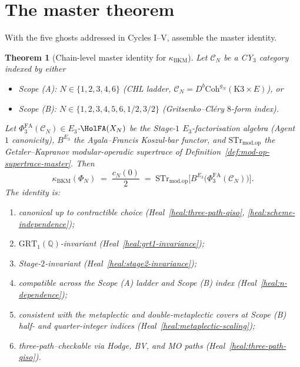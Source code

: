 \documentclass[11pt]{amsart}
\newtheorem{theorem}{Theorem}[section]
\providecommand{\Q}{\mathbb{Q}}
\providecommand{\cC}{\mathcal{C}}
\providecommand{\GRT}{\mathrm{GRT}}
\providecommand{\PhiFA}{\Phi^{\mathrm{FA}}}
\providecommand{\Coh}{\mathrm{Coh}}
\providecommand{\STr}{\mathrm{STr}}
\providecommand{\modop}{\mathrm{mod.op}}
\providecommand{\kBKM}{\kappa_{\mathrm{BKM}}}
\begin{document}
\section{The master theorem}
\label{sec:master-theorem}

With the five ghosts addressed in Cycles I--V, assemble the master
identity.

\begin{theorem}[Chain-level master identity for $\kBKM$]
\label{thm:bl-master-kappa-bkm-chain-level-wave}
Let $\cC_N$ be a CY$_3$ category indexed by either
\begin{itemize}
\item Scope (A): $N \in \{1, 2, 3, 4, 6\}$ (CHL ladder,
$\cC_N = D^b\Coh^{g_N}(\mathrm{K3} \times E)$), or
\item Scope (B): $N \in \{1, 2, 3, 4, 5, 6, 1/2, 3/2\}$
(Gritsenko--Cl\'ery $8$-form index).
\end{itemize}
Let $\PhiFA_3(\cC_N) \in E_3$-$\HolFA(X_N)$ be the Stage-$1$
$E_3$-factorisation algebra (Agent $1$ canonicity), $B^{E_3}$ the
Ayala--Francis Koszul-bar functor, and $\STr_{\modop}$ the
Getzler--Kapranov modular-operadic supertrace of
Definition~\ref{def:mod-op-supertrace-master}. Then
\begin{equation}
\label{eq:master-theorem-final}
 \kBKM(\Phi_N) \;=\; \frac{c_N(0)}{2}
 \;=\; \STr_{\modop}\bigl[B^{E_3}\bigl(\PhiFA_3(\cC_N)\bigr)\bigr].
\end{equation}
The identity is:
\begin{enumerate}[label=\textup{(\roman*)}]
\item canonical up to contractible choice (Heal~\ref{heal:three-path-qiso},
\ref{heal:scheme-independence});
\item $\GRT_1(\Q)$-invariant (Heal~\ref{heal:grt1-invariance});
\item Stage-$2$-invariant (Heal~\ref{heal:stage2-invariance});
\item compatible across the Scope (A) ladder and Scope (B) index
(Heal~\ref{heal:n-dependence});
\item consistent with the metaplectic and double-metaplectic covers
at Scope (B) half- and quarter-integer indices
(Heal~\ref{heal:metaplectic-scaling});
\item three-path--checkable via Hodge, BV, and MO paths
(Heal~\ref{heal:three-path-qiso}).
\end{enumerate}
\end{theorem}
\end{document}
